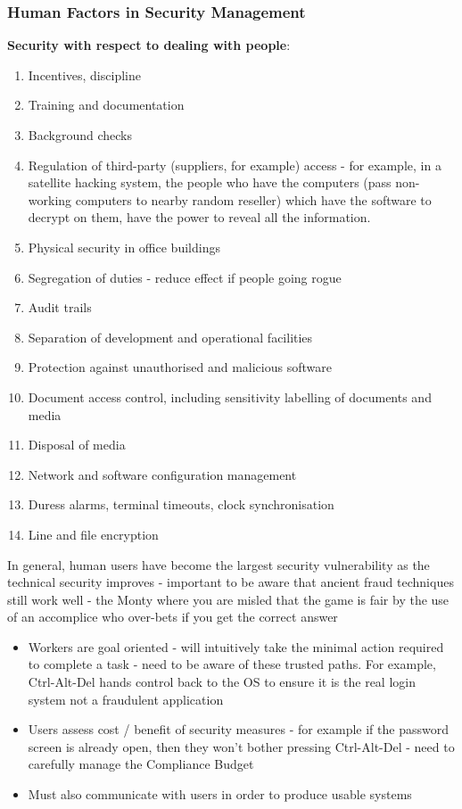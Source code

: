 \documentclass{article}
\begin{document}
\subsubsection{Human Factors in Security Management}
\textbf{Security with respect to dealing with people}:
\begin{enumerate}
	\item Incentives, discipline
	\item Training and documentation
	\item Background checks
	\item Regulation of third-party (suppliers, for example) access - for example, in a satellite hacking system, the people who have the computers (pass non-working computers to nearby random reseller) which have the software to decrypt on them, have the power to reveal all the information. 
	\item Physical security in office buildings
	\item Segregation of duties - reduce effect if people going rogue
	\item Audit trails
	\item Separation of development and operational facilities
	\item Protection against unauthorised and malicious software
	\item Document access control, including sensitivity labelling of documents and media
	\item Disposal of media 
	\item Network and software configuration management
	\item Duress alarms, terminal timeouts, clock synchronisation
	\item Line and file encryption
\end{enumerate}

In general, human users have become the largest security vulnerability as the technical security improves - important to be aware that ancient fraud techniques still work well - the Monty where you are misled that the game is fair by the use of an accomplice who over-bets if you get the correct answer
\begin{itemize}
	\item Workers are goal oriented - will intuitively take the minimal action required to complete a task - need to be aware of these trusted paths. For example, Ctrl-Alt-Del hands control back to the OS to ensure it is the real login system not a fraudulent application
	\item Users assess cost / benefit of security measures - for example if the password screen is already open, then they won't bother pressing Ctrl-Alt-Del - need to carefully manage the Compliance Budget
	\item Must also communicate with users in order to produce usable systems
\end{itemize}
\end{document}
